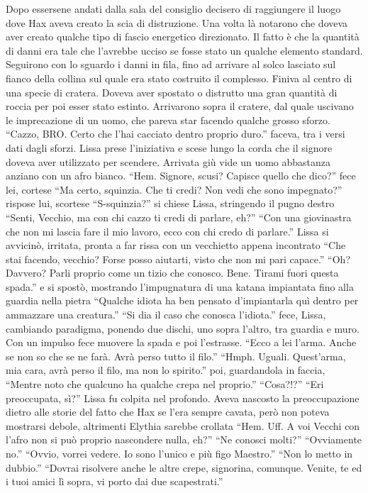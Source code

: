     Dopo essersene andati dalla sala del consiglio decisero di raggiungere
    il luogo dove Hax aveva creato la scia di distruzione. Una volta là
    notarono che doveva aver creato qualche tipo di fascio energetico
    direzionato. Il fatto è che la quantità di danni era tale che l'avrebbe
    ucciso se fosse stato un qualche elemento standard. Seguirono con lo
    sguardo i danni in fila, fino ad arrivare al solco lasciato sul fianco
    della collina sul quale era stato costruito il complesso. Finiva al
    centro di una specie di cratera. Doveva aver spostato o distrutto una
    gran quantità di roccia per poi esser stato estinto. Arrivarono sopra
    il cratere, dal quale uscivano le imprecazione di un uomo, che pareva
    star facendo qualche grosso sforzo. ``Cazzo, BRO. Certo che l'hai
    cacciato dentro proprio duro.'' faceva, tra i versi dati dagli sforzi.
    Lissa prese l'iniziativa e scese lungo la corda che il signore doveva
    aver utilizzato per scendere. Arrivata giù vide un uomo abbastanza
    anziano con un afro bianco. ``Hem. Signore, scusi? Capisce quello che
    dico?'' fece lei, cortese ``Ma certo, squinzia. Che ti credi? Non vedi
    che sono impegnato?'' rispose lui, scortese ``S-squinzia?'' si chiese
    Lissa, stringendo il pugno destro ``Senti, Vecchio, ma con chi cazzo
    ti credi di parlare, eh?'' ``Con una giovinastra che non mi lascia fare
    il mio lavoro, ecco con chi credo di parlare.'' Lissa si avvicinò,
    irritata, pronta a far rissa con un vecchietto appena incontrato ``Che
    stai facendo, vecchio? Forse posso aiutarti, visto che non mi pari
    capace.'' ``Oh? Davvero? Parli proprio come un tizio che conosco. Bene.
    Tirami fuori questa spada.'' e si spostò, mostrando l'impugnatura di
    una katana impiantata fino alla guardia nella pietra ``Qualche idiota
    ha ben pensato d'impiantarla quì dentro per ammazzare una creatura.''
    ``Si dia il caso che conosca l'idiota.'' fece, Lissa, cambiando
    paradigma, ponendo due dischi, uno sopra l'altro, tra guardia e muro.
    Con un impulso fece muovere la spada e poi l'estrasse. ``Ecco a lei
    l'arma. Anche se non so che se ne farà. Avrà perso tutto il filo.''
    ``Hmph. Uguali. Quest'arma, mia cara, avrà perso il filo, ma non lo
    spirito.'' poi, guardandola in faccia, ``Mentre noto che qualcuno ha
    qualche crepa nel proprio.'' ``Cosa?!?'' ``Eri preoccupata, sì?''
    Lissa fu colpita nel profondo. Aveva nascosto la preoccupazione dietro
    alle storie del fatto che Hax se l'era sempre cavata, però non poteva
    mostrarsi debole, altrimenti Elythia sarebbe crollata ``Hem. Uff. A voi
    Vecchi con l'afro non si può proprio nascondere
    nulla, eh?'' ``Ne conosci molti?'' ``Ovviamente no.'' ``Ovvio, vorrei
    vedere. Io sono l'unico e più figo Maestro.'' ``Non lo metto in
    dubbio.'' ``Dovrai risolvere anche le altre crepe, signorina, comunque.
    Venite, te ed i tuoi amici lì sopra, vi porto dai due scapestrati.''


